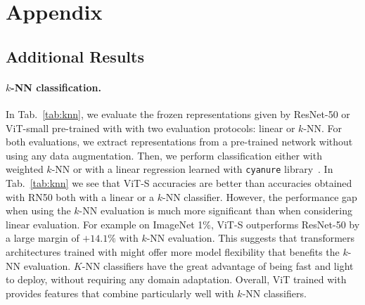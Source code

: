 \renewcommand{\thesubsection}{\Alph{subsection}}
\newcommand\tab[1][5mm]{\hspace*{#1}}
\section*{Appendix}

\subsection{Additional Results}
\label{ap:more_results}
\paragraph{$k$-NN classification.}
\label{sec:knn}
In Tab.~\ref{tab:knn}, we evaluate the frozen representations given by ResNet-50 or ViT-small pre-trained with \OURS with two evaluation protocols: linear or $k$-NN.
For both evaluations, we extract representations from a pre-trained network without using any data augmentation.
Then, we perform classification either with weighted $k$-NN or with a linear regression learned with \texttt{cyanure} library~\cite{mairal2019cyanure}.
In Tab.~\ref{tab:knn} we see that ViT-S accuracies are better than accuracies obtained with RN50 both with a linear or a $k$-NN classifier.
However, the performance gap when using the $k$-NN evaluation is much more significant than when considering linear evaluation.
For example on ImageNet 1\%, ViT-S outperforms ResNet-50 by a large margin of $+14.1\%$ with $k$-NN evaluation.
This suggests that transformers architectures trained with \OURS might offer more model flexibility that benefits the $k$-NN evaluation.
$K$-NN classifiers have the great advantage of being fast and light to deploy, without requiring any domain adaptation.
Overall, ViT trained with \OURS provides features that combine particularly well with $k$-NN classifiers.

